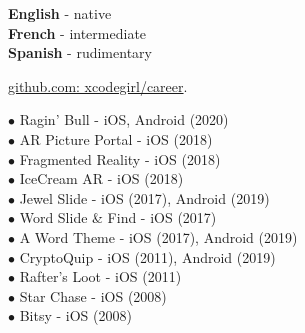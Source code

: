 \documentclass[9pt]{developercv} %
\begin{document}
\begin{minipage}[t]{0.5\textwidth}
	\vspace{-\baselineskip} %

	
	\textbf{English} - native\\
	\textbf{French} - intermediate\\
	\textbf{Spanish} - rudimentary


 {\href{https://github.com/xcodegirl/career/blob/main/xcodegirl-work-samples.md}{github.com: xcodegirl/career}}.

\end{minipage}
\hfill
\begin{minipage}[t]{0.5\textwidth}
	\vspace{-\baselineskip} %
	

$\bullet$ Ragin’ Bull - iOS, Android (2020)
\\ $\bullet$ AR Picture Portal - iOS (2018)
\\ $\bullet$ Fragmented Reality - iOS (2018)
\\ $\bullet$ IceCream AR - iOS (2018)
\\ $\bullet$ Jewel Slide - iOS (2017), Android (2019)
\\ $\bullet$ Word Slide \& Find - iOS (2017)
\\ $\bullet$ A Word Theme - iOS (2017), Android (2019)
\\ $\bullet$ CryptoQuip - iOS (2011), Android (2019)
\\ $\bullet$ Rafter’s Loot - iOS (2011)
\\ $\bullet$ Star Chase - iOS (2008)
\\ $\bullet$ Bitsy - iOS (2008)

\end{minipage}

\end{document}
